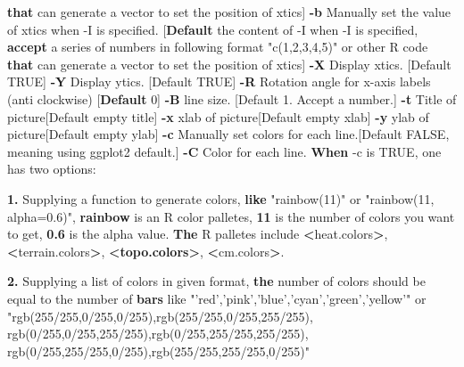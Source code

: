 \documentclass[]{article}
\newenvironment{Shaded}{\begin{snugshade}}{\end{snugshade}}
\newcommand{\KeywordTok}[1]{\textcolor[rgb]{0.13,0.29,0.53}{\textbf{{#1}}}}
\newcommand{\StringTok}[1]{\textcolor[rgb]{0.31,0.60,0.02}{{#1}}}
\newcommand{\NormalTok}[1]{{#1}}
\numberwithin{figure}{section}
\numberwithin{table}{section}
\theoremstyle{definition}
\theoremstyle{definition}
\theoremstyle{definition}
\theoremstyle{remark}
\begin{document}
\begin{Shaded}
\begin{Highlighting}[]
        \KeywordTok{that} \NormalTok{can generate a vector to set the position of xtics]}
    \KeywordTok{-b}  \NormalTok{Manually set the value of xtics when -I is specified.}
        \NormalTok{[}\KeywordTok{Default} \NormalTok{the content of -I when -I is specified, }
        \KeywordTok{accept} \NormalTok{a series of numbers in following format }\StringTok{"c(1,2,3,4,5)"} \NormalTok{or other R code}
        \KeywordTok{that} \NormalTok{can generate a vector to set the position of xtics]}
    \KeywordTok{-X}  \NormalTok{Display xtics. [Default TRUE]}
    \KeywordTok{-Y}  \NormalTok{Display ytics. [Default TRUE]}
    \KeywordTok{-R}  \NormalTok{Rotation angle for x-axis labels (anti clockwise)}
        \NormalTok{[}\KeywordTok{Default} \NormalTok{0]}
    \KeywordTok{-B}  \NormalTok{line size. [Default 1. Accept a number.]}
    \KeywordTok{-t}  \NormalTok{Title of picture[Default empty title]}
    \KeywordTok{-x}  \NormalTok{xlab of picture[Default empty xlab]}
    \KeywordTok{-y}  \NormalTok{ylab of picture[Default empty ylab]}
    \KeywordTok{-c}  \NormalTok{Manually set colors for each line.[Default FALSE, meaning using ggplot2 default.]}
    \KeywordTok{-C}  \NormalTok{Color for each line.}
        \KeywordTok{When} \NormalTok{-c is TRUE, one has two options:}

        \KeywordTok{1.} \NormalTok{Supplying a function to generate colors, }
        \KeywordTok{like} \StringTok{"rainbow(11)"} \NormalTok{or }\StringTok{"rainbow(11, alpha=0.6)"}\NormalTok{, }
            \KeywordTok{rainbow} \NormalTok{is an R color palletes, }
            \KeywordTok{11} \NormalTok{is the number of colors you want to get, }
            \KeywordTok{0.6} \NormalTok{is the alpha value.}
        \KeywordTok{The} \NormalTok{R palletes include }\KeywordTok{<}\NormalTok{heat.colors}\KeywordTok{>}\NormalTok{, }\KeywordTok{<}\NormalTok{terrain.colors}\KeywordTok{>}\NormalTok{,}
            \KeywordTok{<topo.colors>}\NormalTok{, }\KeywordTok{<}\NormalTok{cm.colors}\KeywordTok{>}\NormalTok{.}

        \KeywordTok{2.} \NormalTok{Supplying a list of colors in given format, }
        \KeywordTok{the} \NormalTok{number of colors should be equal to the number of}
        \KeywordTok{bars} \NormalTok{like }\StringTok{"'red','pink','blue','cyan','green','yellow'"} \NormalTok{or}
        \StringTok{"rgb(255/255,0/255,0/255),rgb(255/255,0/255,255/255),}
\StringTok{         rgb(0/255,0/255,255/255),rgb(0/255,255/255,255/255),}
\StringTok{         rgb(0/255,255/255,0/255),rgb(255/255,255/255,0/255)"}
        


\end{Highlighting}
\end{Shaded}
\end{document}
